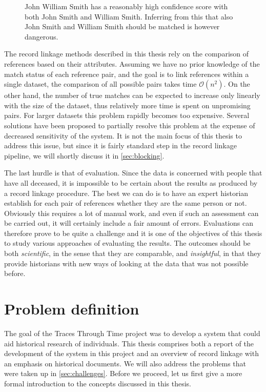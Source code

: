 \begin{figure}
    \centering
    
    \caption[Graphical depiction of transitive closure]{John William Smith has a reasonably high confidence score with both John Smith and William Smith. Inferring from this that also John Smith and William Smith should be matched is however dangerous.}
    \label{fig:transitive_closure}
\end{figure}

The record linkage methods described in this thesis rely on the comparison of references based on their attributes.
Assuming we have no prior knowledge of the match status of each reference pair, and the goal is to link references within a single dataset, the comparison of all possible pairs takes time $\mathcal{O}(n^2)$.
On the other hand, the number of true matches can be expected to increase only linearly with the size of the dataset, thus relatively more time is spent on unpromising pairs.
For larger datasets this problem rapidly becomes too expensive.
Several solutions have been proposed to partially resolve this problem at the expense of decreased sensitivity of the system.
It is not the main focus of this thesis to address this issue, but since it is fairly standard step in the record linkage pipeline, we will shortly discuss it in \cref{sec:blocking}.

The last hurdle is that of evaluation.
Since the data is concerned with people that have all deceased, it is impossible to be certain about the results as produced by a record linkage procedure.
The best we can do is to have an expert historian establish for each pair of references whether they are the same person or not.
Obviously this requires a lot of manual work, and even if such an assessment can be carried out, it will certainly include a fair amount of errors.
Evaluations can therefore prove to be quite a challenge and it is one of the objectives of this thesis to study various approaches of evaluating the results.
The outcomes should be both \emph{scientific}, in the sense that they are comparable, and \emph{insightful}, in that they provide historians with new ways of looking at the data that was not possible before.




\section{Problem definition}
\label{sec:problem_definition}
The goal of the Traces Through Time project was to develop a system that could aid historical research of individuals.
This thesis comprises both a report of the development of the system in this project and an overview of record linkage with an emphasis on historical documents.
We will also address the problems that were taken up in \cref{sec:challenges}.
Before we proceed, let us first give a more formal introduction to the concepts discussed in this thesis.

